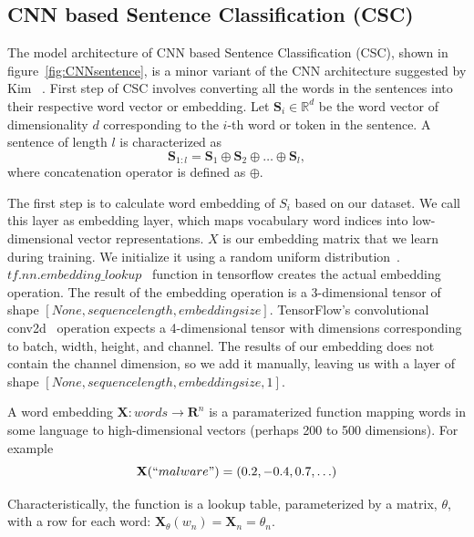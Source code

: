 \subsection{CNN based Sentence Classification (CSC)}

The model architecture of CNN based Sentence Classification (CSC), shown in figure~\ref{fig:CNNsentence}, is a minor variant of the CNN architecture suggested by Kim ~\cite{kim}. First step of CSC involves converting all the words in the sentences into their respective word vector or embedding.
Let $\mathbf{S}_i \in \mathbb{R}^{d}$ be the  word vector of dimensionality $d$ corresponding to the $i$-th word or token in the sentence. A sentence of length $l$ is characterized as
\begin{equation}
\mathbf{S}_{1:l} = \mathbf{S}_1 \oplus \mathbf{S}_2 \oplus \ldots \oplus \mathbf{S}_l,
\end{equation}
where concatenation operator is defined as $\oplus$. 




The first step is to calculate word embedding of $S_i$ based on our dataset. We call this layer as embedding layer, which maps vocabulary word indices into low-dimensional vector representations. $X$ is our embedding matrix that we learn during training. We initialize it using a random uniform distribution~\cite{claessen}. $tf.nn.embedding\_lookup$~\cite{tensorflowapi} function in tensorflow creates the actual embedding operation. The result of the embedding operation is a 3-dimensional tensor of shape $[None, sequencelength, embeddingsize]$.
TensorFlow's convolutional conv2d~\cite{tensorflowapi} operation expects a 4-dimensional tensor with dimensions corresponding to batch, width, height, and channel. The results of our embedding does not contain the channel dimension, so we add it manually, leaving us with a layer of shape $[None, sequencelength, embeddingsize, 1]$.

A word embedding $\mathbf{X} \colon words \rightarrow \mathbf{R}^n$  is a paramaterized function mapping words in some language to high-dimensional vectors (perhaps 200 to 500 dimensions). For example 
\begin{equation}
\mathbf{X}(``malware") = (0.2,-0.4,0.7,\ldots)
\end{equation}

Characteristically, the function is a lookup table, parameterized by a matrix, $\theta$, with a row for each word: $\mathbf{X}_\theta(w_n)= \mathbf{X}_n = \theta_n$.

